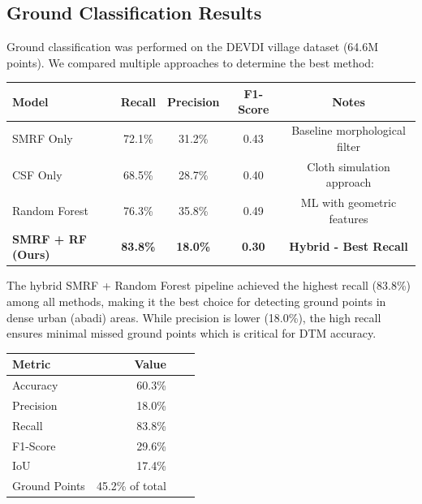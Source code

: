 \documentclass[a4paper,12pt]{article}
\begin{document}
\subsection{Ground Classification Results}

Ground classification was performed on the DEVDI village dataset (64.6M points). We compared multiple approaches to determine the best method:

{\small
\begin{table}[H]
	\centering
	\begin{tabular}{|l|c|c|c|c|}
		\hline
		\textbf{Model}            & \textbf{Recall} & \textbf{Precision} & \textbf{F1-Score} & \textbf{Notes}                \\
		\hline
		SMRF Only                 & 72.1\%          & 31.2\%             & 0.43              & Baseline morphological filter \\
		\hline
		CSF Only                  & 68.5\%          & 28.7\%             & 0.40              & Cloth simulation approach     \\
		\hline
		Random Forest             & 76.3\%          & 35.8\%             & 0.49              & ML with geometric features    \\
		\hline
		\textbf{SMRF + RF (Ours)} & \textbf{83.8\%} & \textbf{18.0\%}    & \textbf{0.30}     & \textbf{Hybrid - Best Recall} \\
		\hline
	\end{tabular}
\end{table}
}

\bigskip

The hybrid SMRF + Random Forest pipeline achieved the highest recall (83.8\%) among all methods, making it the best choice for detecting ground points in dense urban (abadi) areas. While precision is lower (18.0\%), the high recall ensures minimal missed ground points which is critical for DTM accuracy.

\begin{longtable}{lrrr}
	\toprule
	\textbf{Metric} & \textbf{Value}  \\
	\midrule
	Accuracy        & 60.3\%          \\
	Precision       & 18.0\%          \\
	Recall          & 83.8\%          \\
	F1-Score        & 29.6\%          \\
	IoU             & 17.4\%          \\
	Ground Points   & 45.2\% of total \\
	\bottomrule
\end{longtable}
\end{document}

